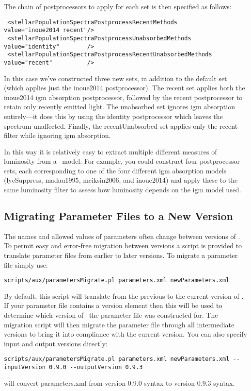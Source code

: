 The chain of postprocessors to apply for each set is then specified as follows:
\begin{verbatim}
 <stellarPopulationSpectraPostprocessRecentMethods           value="inoue2014 recent"/>
 <stellarPopulationSpectraPostprocessUnabsorbedMethods       value="identity"        />
 <stellarPopulationSpectraPostprocessRecentUnabsorbedMethods value="recent"          />
\end{verbatim}
In this case we've constructed three new sets, in addition to the default set (which applies just the {\normalfont \ttfamily inoue2014} postprocessor). The {\normalfont \ttfamily recent} set applies both the {\normalfont \ttfamily inoue2014} \gls{igm} absorption postprocessor, followed by the {\normalfont \ttfamily recent} postprocessor to retain only recently emitted light. The {\normalfont \ttfamily unabsorbed} set ignores \gls{igm} absorption entirely---it does this by using the {\normalfont \ttfamily identity} postprocessor which leaves the spectrum unaffected. Finally, the {\normalfont \ttfamily recentUnabsorbed} set applies only the {\normalfont \ttfamily recent} filter while ignoring \gls{igm} absorption.

In this way it is relatively easy to extract multiple different measures of luminosity from a \glc\ model. For example, you could construct four postprocessor sets, each corresponding to one of the four different \gls{igm} absorption models ({\normalfont \ttfamily lycSuppress}, {\normalfont \ttfamily madau1995}, {\normalfont \ttfamily meiksin2006}, and {\normalfont \ttfamily inoue2014}) and apply these to the same luminosity filter to assess how luminosity depends on the \gls{igm} model used.

\subsection{Migrating Parameter Files to a New Version}\label{sec:MigrateParameters}

The names and allowed values of parameters often change between versions of \glc. To permit easy and error-free migration between versions a script is provided to translate parameter files from earlier to later versions. To migrate a parameter file simply use:
\begin{verbatim}
scripts/aux/parametersMigrate.pl parameters.xml newParameters.xml
\end{verbatim}
By default, this script will translate from the previous to the current version of \glc. If your parameter file contains a {\normalfont \ttfamily version} element then this will be used to determine which version of \glc\ the parameter file was constructed for. The migration script will then migrate the parameter file through all intermediate versions to bring it into compliance with the current version. You can also specify input and output versions directly:
\begin{verbatim}
scripts/aux/parametersMigrate.pl parameters.xml newParameters.xml --inputVersion 0.9.0 --outputVersion 0.9.3
\end{verbatim}
will convert {\normalfont \ttfamily parameters.xml} from version 0.9.0 syntax to version 0.9.3 syntax.

